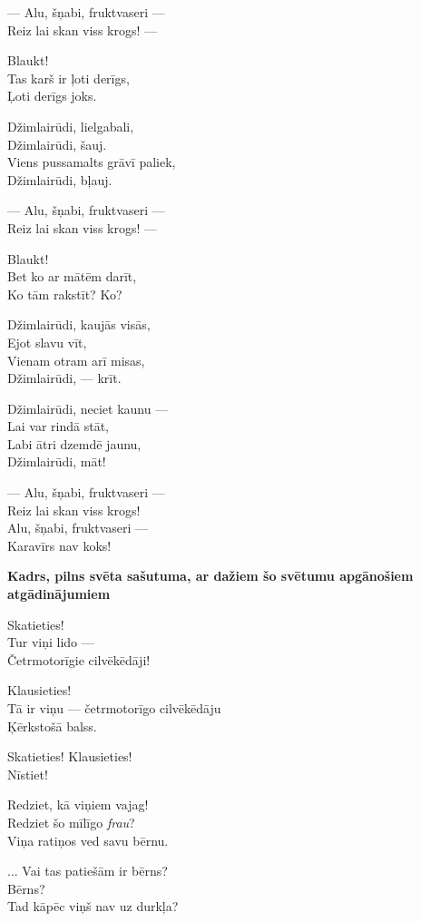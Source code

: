\documentclass[14pt]{extarticle}
\begin{document}
--- Alu, šņabi, fruktvaseri ---\\
Reiz lai skan viss krogs! ---

Blaukt!\\
Tas karš ir ļoti derīgs,\\
Ļoti derīgs joks.

Džimlairūdi, lielgabali,\\
Džimlairūdi, šauj.\\
Viens pussamalts grāvī paliek,\\
Džimlairūdi, bļauj.

--- Alu, šņabi, fruktvaseri ---\\
Reiz lai skan viss krogs! ---

Blaukt!\\
Bet ko ar mātēm darīt,\\
Ko tām rakstīt? Ko?

Džimlairūdi, kaujās visās,\\
Ejot slavu vīt,\\
Vienam otram arī misas,\\
Džimlairūdi, --- krīt.

Džimlairūdi, neciet kaunu ---\\
Lai var rindā stāt,\\
Labi ātri dzemdē jaunu,\\
Džimlairūdi, māt!

--- Alu, šņabi, fruktvaseri ---\\
Reiz lai skan viss krogs!\\
Alu, šņabi, fruktvaseri ---\\
Karavīrs nav koks!


\newpage

{\bf Kadrs, pilns svēta sašutuma, 
ar dažiem šo svētumu apgānošiem atgādinājumiem}

Skatieties!\\
Tur viņi lido ---\\
Četrmotorīgie cilvēkēdāji!

Klausieties!\\
Tā ir viņu --- četrmotorīgo cilvēkēdāju\\
Ķērkstošā balss.

Skatieties! Klausieties!\\
Nīstiet!

Redziet, kā viņiem vajag!\\
Redziet šo mīlīgo {\em frau}?\\
Viņa ratiņos ved savu bērnu.

... Vai tas patiešām ir bērns?\\
Bērns?\\
Tad kāpēc viņš nav uz durkļa?
\end{document}
